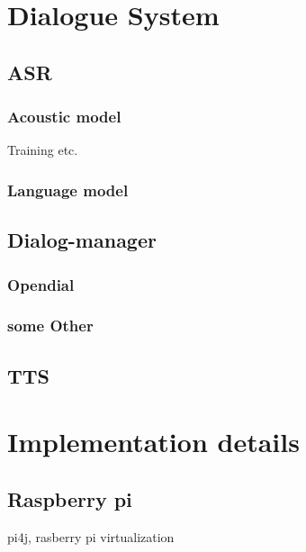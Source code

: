 \documentclass[a4paper, 12pt]{article}
\begin{document}


\pagestyle{empty}

\pagestyle{plain}
\setcounter{page}{1}


\section{Dialogue System}

\subsection{ASR}

\subsubsection{Acoustic model}
Training etc.

\subsubsection{Language model}

%

\subsection{Dialog-manager}
\subsubsection{Opendial}
\subsubsection{some Other}

\subsection{TTS}

\section{Implementation details}
\subsection{Raspberry pi}
pi4j, rasberry pi virtualization
\end{document}
